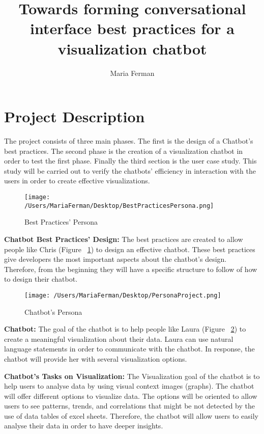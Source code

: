 \documentclass[a4paper,10pt]{article}
\title{Towards forming conversational interface best practices for a visualization chatbot}
\author{Maria Ferman}
\begin{document}
\maketitle

\section*{Project Description}

The project consists of three main phases. The first is the design of a Chatbot's best practices. The second phase is the creation of a visualization chatbot in order to test the first phase. Finally the third section is the user case study. This study will be carried out to verify the chatbots' efficiency in interaction with the users in order to create effective visualizations.

\begin{figure}
\centering
\texttt{[image: /Users/MariaFerman/Desktop/BestPracticesPersona.png]}
\caption{Best Practices' Persona}
\label{FigureChris}
\end{figure}

\textbf{Chatbot Best Practices' Design:} The best practices are created to allow people like Chris (Figure ~\ref{FigureChris}) to design an effective chatbot. These best practices give developers the most important aspects about the chatbot's design. Therefore, from the beginning they will have a specific structure to follow of how to design  their chatbot.

\begin{figure}
\centering
\texttt{[image: /Users/MariaFerman/Desktop/PersonaProject.png]}
\caption{Chatbot's Persona}
\label{FigureLaura}
\end{figure}

\textbf{Chatbot:} The goal of the chatbot is to help people like Laura (Figure ~\ref{FigureLaura}) to create a meaningful visualization about their data. Laura can use natural language statements in order to communicate with the chatbot. In response, the chatbot will provide her with several visualization options.

\textbf{Chatbot's Tasks on Visualization:} The Visualization goal of the chatbot is to help users to analyse data by using visual context images (graphs). The chatbot will offer different options to visualize data. The options will be oriented to allow users to see patterns, trends, and correlations that might be not detected by the use of data tables of excel sheets. Therefore, the chatbot will allow users to easily analyse their data in order to have deeper insights.  

\medskip


\end{document}
